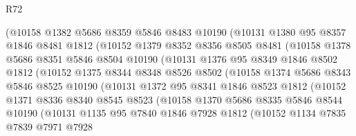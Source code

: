 \begin{lexlean}{R72}
\begin{coremodule}
              (@10158
                @1382
                @5686
                @8359
                @5846
                @8483
                @10190
                (@10131
                  @1380
                  @95
                  @8357
                  @1846
                  @8481
                  @1812
                  (@10152
                    @1379
                    @8352
                    @8356
                    @8505
                    @8481
                    (@10158
                      @1378
                      @5686
                      @8351
                      @5846
                      @8504
                      @10190
                      (@10131
                        @1376
                        @95
                        @8349
                        @1846
                        @8502
                        @1812
                        (@10152
                          @1375
                          @8344
                          @8348
                          @8526
                          @8502
                          (@10158
                            @1374
                            @5686
                            @8343
                            @5846
                            @8525
                            @10190
                            (@10131
                              @1372
                              @95
                              @8341
                              @1846
                              @8523
                              @1812
                              (@10152
                                @1371
                                @8336
                                @8340
                                @8545
                                @8523
                                (@10158
                                  @1370
                                  @5686
                                  @8335
                                  @5846
                                  @8544
                                  @10190
                                  (@10131
                                    @1135
                                    @95
                                    @7840
                                    @1846
                                    @7928
                                    @1812
                                    (@10152
                                      @1134
                                      @7835
                                      @7839
                                      @7971
                                      @7928

\end{coremodule}
\end{lexlean}
